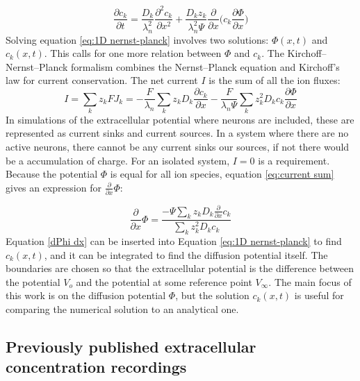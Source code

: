\documentclass{article}
\begin{document}
\begin{equation}\label{eq:1D nernst-planck}
\frac{\partial c_k}{\partial t}= \frac{D_k}{\lambda_n^2} \frac{\partial^2 c_k}{\partial x^2}+\frac{D_k z_k}{\lambda_n^2 \Psi} \frac{\partial }{\partial x}  \bigg(c_k \frac{\partial \Phi}{\partial x} \bigg)
\end{equation}
Solving equation \ref{eq:1D nernst-planck} involves two solutions: $\Phi (x,t)$ and $c_k(x,t)$. This calls for one more relation between $\Phi$ and $c_k$. The Kirchoff--Nernst--Planck formalism \cite{Halnes2015} \cite{Halnes2016} combines the Nernst--Planck equation and Kirchoff's law for current conservation. 
The net current $I$ is the sum of all the ion fluxes:
\begin{equation}\label{eq:current sum}
I = \sum_{k}z_k FJ_k = -\frac{F}{\lambda_n}\sum_k z_k D_k  \frac{\partial c_k}{ \partial x} - \frac{F}{\lambda_n \Psi}\sum_k z_k^2D_k c_k \frac{\partial \Phi}{\partial x}
\end{equation}
In simulations of the extracellular potential where neurons are included, these are represented as current sinks and current sources. In a system where there are no active neurons, there cannot be any current sinks our sources, if not there would be a accumulation of charge. For an isolated system, $I=0$ is a requirement. Because the potential 
$\Phi$ is equal for all ion species, equation \ref{eq:current sum} gives an  expression for $ \frac{\partial}{\partial x} \Phi$:

\begin{equation}\label{dPhi dx}
\frac{\partial}{\partial x} \Phi = \frac{-\Psi \sum_k z_k D_k \frac{\partial}{\partial x} c_k}{\sum_k z_k^2 D_k c_k}
\end{equation}
Equation \ref{dPhi dx} can be inserted into Equation \ref{eq:1D nernst-planck} to find $c_k(x,t)$, and it can be integrated to find the diffusion potential itself. The boundaries are chosen so that the extracellular potential is the difference between the potential $V_o$ and the potential at some reference point $V_{\infty}$. The main focus of this work is on the diffusion potential $\Phi$, but the solution $c_k(x,t)$ is useful for comparing the numerical solution to an analytical one.

\subsection{Previously published extracellular concentration recordings}\label{EC c recordings}
 
\end{document}
